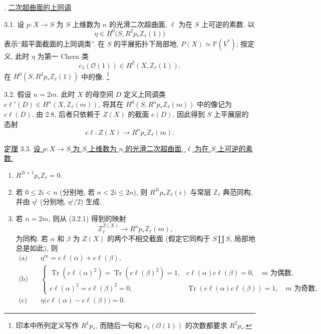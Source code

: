 . \underline{二次超曲面的上同调}

3.1. 设 $p:X\longrightarrow S$ 为 $S$ 上维数为 $n$ 的光滑二次超曲面, $\ell$ 为在 $S$ 上可逆的素数. 以
\begin{equation*}
\eta\in H^0\bigl(S,R^2p_*\mathbb Z_\ell(1)\bigr)
\end{equation*}
表示``超平面截面的上同调类''. 在 $S$ 的平展拓扑下局部地, $P(X)\simeq\mathbb P(V^*)$; 按定义, 此时 $\eta$ 为第一 Chern 类
\begin{equation*}
c_1(\mathcal O(1))\in H^2(X,\mathbb Z_\ell(1)).
\end{equation*}
在 $H^0(S,R^2p_*\mathbb Z_\ell(1))$ 中的像.
\footnote{印本中所列定义写作 $R^1p_*$, 而随后一句和 $c_1(\mathcal O(1))$ 的次数都要求 $R^2p_*$.}

3.2. 假设 $n=2m$. 此时 $X$ 的母空间 $D$ 定义上同调类 $c\ell'(D)\in H^n(X,\mathbb Z_\ell(m))$, 将其在 $H^0(S,R^np_*\mathbb Z_\ell(m))$ 中的像记为 $c\ell(D)$. 由 2.8, 后者只依赖于 $Z(X)$ 的截面 $e(D)$. 因此得到 $S$ 上平展层的态射
\begin{equation}\tag{3.2.1}
c\ell:Z(X)\longrightarrow R^np_*\mathbb Z_\ell(m).
\end{equation}

\underline{定理} 3.3. \underline{设 $p:X\longrightarrow S$ 为 $S$ 上维数为 $n$ 的光滑二次超曲面, $\ell$ 为在 $S$ 上可逆的素数.}

\begin{enumerate}[label=(\roman*),leftmargin=2.6em]
\item $R^{2i+1}p_*\mathbb Z_\ell=0$.


\item 若 $0\leq 2i<n$ (分别地, 若 $n<2i\leq 2n$), 则 $R^{2i}p_*\mathbb Z_\ell(i)$ 与常层 $\mathbb Z_\ell$ 典范同构, 并由 $\eta^i$ (分别地, $\eta^i/2$) 生成.

\item 若 $n=2m$, 则从 (3.2.1) 得到的映射
\begin{equation}\tag{3.3.1}
\mathbb Z_\ell^{Z(X)}\longrightarrow R^np_*\mathbb Z_\ell(m),
\end{equation}
为同构. 若 $\alpha$ 和 $\beta$ 为 $Z(X)$ 的两个不相交截面 (假定它同构于 $S\amalg S$, 局部地总是如此), 则
\begin{align*}
\text{(a)}\quad &\eta^m=c\ell(\alpha)+c\ell(\beta),\\[1ex]
\text{(b)}\quad &
\begin{cases}
\operatorname{Tr}(c\ell(\alpha)^2)
=\operatorname{Tr}(c\ell(\beta)^2)=1,
& c\ell(\alpha)c\ell(\beta)=0,\quad m\text{ 为偶数},\\[1ex]
c\ell(\alpha)^2=c\ell(\beta)^2=0,
& \operatorname{Tr}(c\ell(\alpha)c\ell(\beta))=1,
  \quad m\text{ 为奇数},
\end{cases}\\[1ex]
\text{(c)}\quad &\eta\bigl(c\ell(\alpha)-c\ell(\beta)\bigr)=0.
\end{align*}
\end{enumerate}

